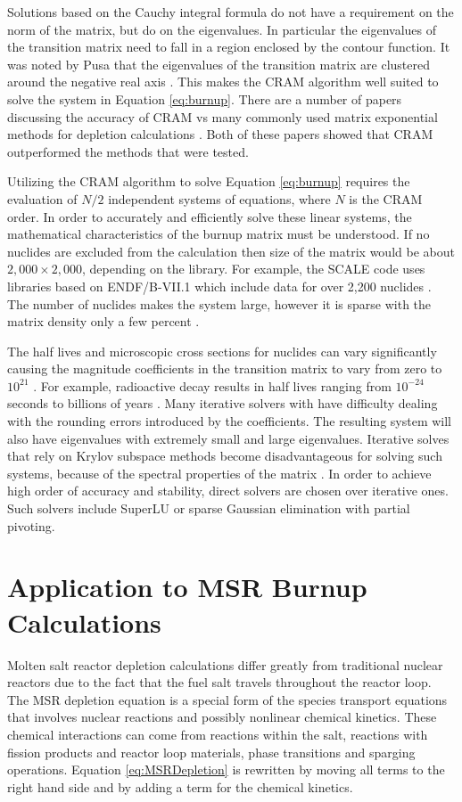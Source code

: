 Solutions based on the Cauchy integral formula do not have a requirement on the norm of the matrix, but do on the eigenvalues. In particular the eigenvalues of the transition matrix need to fall in a region enclosed by the contour function. It was noted by Pusa that the eigenvalues of the transition matrix are clustered around the negative real axis \cite{pusa2010}. This makes the CRAM algorithm well suited to solve the system in Equation \ref{eq:burnup}. There are a number of papers discussing the accuracy of CRAM vs many commonly used matrix exponential methods for depletion calculations \cite{isotalo2011} \cite{pusa2010}. Both of these papers showed that CRAM outperformed the methods that were tested.

Utilizing the CRAM algorithm to solve Equation \ref{eq:burnup} requires the evaluation of $N/2$ independent systems of equations, where $N$ is the CRAM order. In order to accurately and efficiently solve these linear systems, the mathematical characteristics of the burnup matrix must be understood. If no nuclides are excluded from the calculation then size of the matrix would be about $2,000 \times 2,000$, depending on the library. For example, the SCALE code uses libraries based on ENDF/B-VII.1 which include data for over 2,200 nuclides \cite{scaleManual}. The number of nuclides makes the system large, however it is sparse with the matrix density only a few percent \cite{pusa2013}. 

The half lives and microscopic cross sections for nuclides can vary significantly causing the magnitude coefficients in the transition matrix to vary from zero to $10^{21}$ \cite{pusa2013}. For example, radioactive decay results in half lives ranging from $10^{-24}$ seconds to billions of years \cite{pusaThesis}. Many iterative solvers with have difficulty dealing with the rounding errors introduced by the coefficients. The resulting system will also have eigenvalues with extremely small and large eigenvalues. Iterative solves that rely on Krylov subspace methods become disadvantageous for solving such systems, because of the spectral properties of the matrix \cite{pusa2013}. In order to achieve high order of accuracy and stability, direct solvers are chosen over iterative ones. Such solvers include SuperLU or sparse Gaussian elimination with partial pivoting.

\section{Application to MSR Burnup Calculations}
Molten salt reactor depletion calculations differ greatly from traditional nuclear reactors due to the fact that the fuel salt travels throughout the reactor loop. The MSR depletion equation is a special form of the species transport equations that involves nuclear reactions and possibly nonlinear chemical kinetics. These chemical interactions can come from reactions within the salt, reactions with fission products and reactor loop materials, phase transitions and sparging operations. Equation \ref{eq:MSRDepletion} is rewritten by moving all terms to the right hand side and by adding a term for the chemical kinetics.

